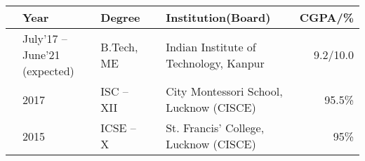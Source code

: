 
\newcommand{\education}[4]{
  & #1 & #2 & &#3 & #4
}
\begin{center}
\begin{tabular}{ | L{0.05cm} l | L{3cm} | L{0.05cm} C{7cm} | r |}
  \hline
  \education{\textbf{Year}}{\textbf{Degree}}{\textbf{Institution(Board)}}{\textbf{CGPA/\%}}\\
  \hline
  \education{July'17 -- June'21 (expected)}{B.Tech, ME}{Indian Institute of Technology, Kanpur}{9.2/10.0}\\
  \education{2017}{ISC -- XII}{City Montessori School, Lucknow (CISCE)}{95.5\%}\\
  \education{2015}{ICSE -- X}{St. Francis' College, Lucknow (CISCE)}{95\%}\\
  \hline
\end{tabular}
\end{center}
\vspace{-4mm}


